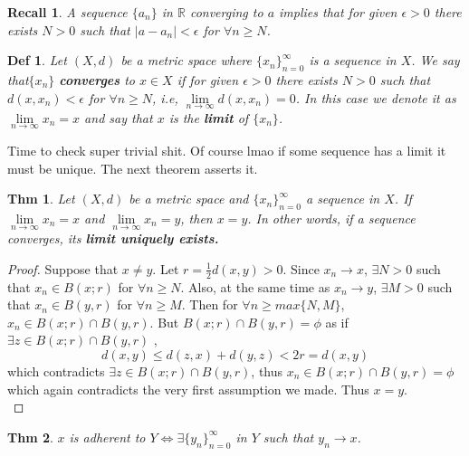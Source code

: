 \documentclass[paper=a4, fontsize=11pt]{scrartcl}
\newtheorem{theorem}{Thm}
\newtheorem{definition}{Def}
\newtheorem*{recall}{Recall}
\begin{document}
\begin{recall}
	A sequence $\{a_n\}$ in $\mathbb{R}$ converging to $a$ implies that for given $\epsilon >0$ there exists $N>0$ such that $|a-a_n|<\epsilon$ for $\forall n\geq N$.\\
\end{recall}

\begin{definition}
	Let $(X,d)$ be a metric space where $\{x_n\}^\infty_{n=0}$ is a sequence in $X$. We say that$\{x_n\}$ \textbf{converges} to $x \in X$ if for given $\epsilon>0$ there exists $N>0$ such that $d(x,x_n)<\epsilon$ for $\forall n\geq N$, i.e, $\lim\limits_{n \to \infty} d(x,x_n)=0$. In this case we denote it as $\lim\limits_{n \to \infty} x_n = x$ and say that $x$ is the \textbf{limit} of $\{x_n\}$.  \\
\end{definition}

Time to check super trivial shit. Of course lmao if some sequence has a limit it must be unique. The next theorem asserts it.\\

\begin{theorem}
	Let $(X,d)$ be a metric space and $\{x_n\}^\infty_{n=0}$ a sequence in $X$. If $\lim\limits_{n \to \infty} x_n = x$ and $\lim\limits_{n \to \infty} x_n = y$, then $x=y$. In other words, if a sequence converges, its \textbf{limit uniquely exists.}\\
\end{theorem}

\begin{proof}
	Suppose that $x \neq y$. Let $r=\frac{1}{2} d(x,y) >0$. Since $x_n \to x$, $\exists N>0$ such that $x_n \in B(x;r)$ for $\forall n \geq N$. Also, at the same time as $x_n \to y$, $\exists M>0$ such that $x_n \in B(y,r)$ for $\forall n \geq M$. Then for $\forall n \geq max\{N,M\}$, $x_n \in B(x;r)\cap B(y,r)$. But $B(x;r)\cap B(y,r)=\phi$ as if $\exists z \in B(x;r)\cap B(y,r)$ ,
	\begin{equation} \nonumber
		d(x,y) \leq d(z,x) + d(y,z) < 2r = d(x,y)
	\end{equation} 
	which contradicts $\exists z \in B(x;r)\cap B(y,r)$, thus $x_n \in B(x;r)\cap B(y,r)=\phi$ which again contradicts the very first assumption we made. Thus $x=y$.\\
\end{proof}

\begin{theorem}
	$x$ is adherent to $Y \iff \exists \{y_n\}^\infty_{n=0}$ in $Y$ such that $y_n \to x$.\\
\end{theorem}
\end{document}
